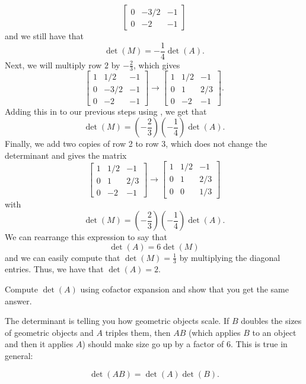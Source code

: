\begin{exampleSol}
\[\begin{bmatrix}
 0 & -3/2  & -1\\
 0 & -2 & -1\end{bmatrix} \] and we still have that
 \[ \det(M) = -\frac{1}{4}\det(A). \] Next, we will multiply row $2$ by $-\frac{2}{3}$, which gives
 \[  \begin{bmatrix}  1  & 1/2 & -1\\
 0 & -3/2  & -1\\
 0 & -2 & -1\end{bmatrix} \rightarrow \begin{bmatrix}  1  & 1/2 & -1\\
 0 & 1  & 2/3\\
 0 & -2 & -1\end{bmatrix}. \] Adding this in to our previous steps using , we get that 
 \[ \det(M) = \left(-\frac{2}{3} \right) \left( -\frac{1}{4} \right) \det(A). \] Finally, we add two copies of row 2 to row 3, which does not change the determinant and gives the matrix
 \[ \begin{bmatrix}  1  & 1/2 & -1\\
 0 & 1  & 2/3\\
 0 & -2 & -1\end{bmatrix} \rightarrow
 \begin{bmatrix}  1  & 1/2 & -1\\
 0 & 1  & 2/3\\
 0 & 0 & 1/3\end{bmatrix} \] with \[ \det(M) = \left(-\frac{2}{3} \right) \left( -\frac{1}{4} \right) \det(A) . \]
 We can rearrange this expression to say that
 \[ \det(A) = 6\det(M) \] and we can easily compute that $\det(M) = \frac{1}{3}$ by multiplying the diagonal entries. Thus, we have that $\det(A) = 2$.
\end{exampleSol}

\begin{exercise}
Compute $\det(A)$ using cofactor expansion and show that you get the same answer. 
\end{exercise}

The determinant is telling you how geometric objects scale.
If $B$ doubles the sizes of geometric objects and $A$ triples them,
then $AB$ (which applies $B$ to an object and then it applies $A$) should make size
go up by a factor of $6$.  This is true in general:

\begin{theorem1}{}
\begin{equation*}
\det(AB) = \det(A)\det(B) .
\end{equation*}
\end{theorem1}

